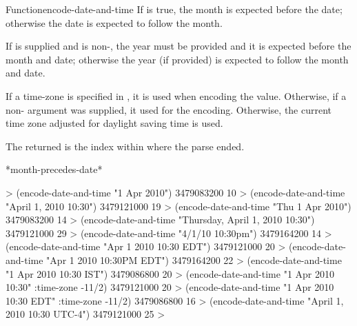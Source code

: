 \documentclass[10pt,twoside,english,pdftex]{article}
\begin{document}
\begin{functiondoc}{Function}{encode-date-and-time}
\W{} 
%
If  is true, the month is expected before the date;
otherwise the date is expected to follow the month.

\W{} 
%
If  is supplied and is non-\nil, the year must be provided
and it is expected before the month and date; otherwise the year (if provided)
is expected to follow the month and date.

\W{} 
%
If a time-zone is specified in , it is used when encoding the
 value.  Otherwise, if a non-\nil{}
 argument was supplied, it used for the encoding.
Otherwise, the current time zone adjusted for daylight saving time is used.

The returned  is the index within  where the
parse ended.

\begin{alsos}{*month-precedes-date*}
\end{alsos}

\fnexamples
%
\W\supp
\begin{example}
  > (encode-date-and-time "1 Apr 2010")
  3479083200
  10
  > (encode-date-and-time "April 1, 2010 10:30")
  3479121000
  19\goodpagebreak
  > (encode-date-and-time "Thu 1 Apr 2010")
  3479083200
  14
  > (encode-date-and-time "Thursday, April 1, 2010 10:30")
  3479121000
  29\goodpagebreak
  > (encode-date-and-time "4/1/10 10:30pm")
  3479164200
  14\goodpagebreak
  > (encode-date-and-time "Apr 1 2010 10:30 EDT")
  3479121000
  20\goodpagebreak
  > (encode-date-and-time "Apr 1 2010 10:30PM EDT")
  3479164200
  22\goodpagebreak
  > (encode-date-and-time "1 Apr 2010 10:30 IST")
  3479086800
  20\goodpagebreak
  > (encode-date-and-time "1 Apr 2010 10:30" :time-zone -11/2)
  3479121000
  20\goodpagebreak
  > (encode-date-and-time "1 Apr 2010 10:30 EDT" :time-zone -11/2)
  3479086800
  16\goodpagebreak
  > (encode-date-and-time "April 1, 2010 10:30 UTC-4")
  3479121000
  25
  >
\end{example}

\end{functiondoc}

\end{document}
